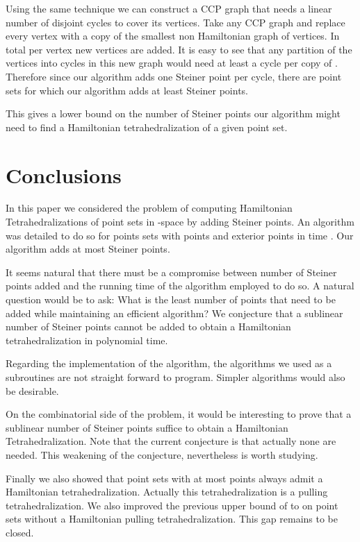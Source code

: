 \documentclass{article}
\begin{document}
Using the same technique we can construct a CCP graph that needs a linear number of disjoint cycles to cover its vertices. Take any CCP graph and replace every vertex with a copy of the smallest
non Hamiltonian graph  of  vertices. In total per vertex  new vertices are added. It is easy to see that any partition of the vertices into cycles in this new graph would need at least a cycle per
 copy of . Therefore since our algorithm adds one Steiner point per cycle, there  are point sets
for which our algorithm adds at least  Steiner points.\par

 This gives a lower bound on the number of Steiner points our algorithm might need to find a Hamiltonian tetrahedralization of a given point set.

\section{Conclusions}\label{section:conclusions}

In this paper we considered the problem of computing Hamiltonian Tetrahedralizations
of point sets in -space by adding Steiner points. An algorithm was detailed to do so
for points sets with  points and  exterior points in time   .
Our algorithm adds at most   Steiner points.\par

It seems natural that there must be a compromise between number of Steiner points added and
the running time of the algorithm employed to do so. A natural question would be to ask:
What is the least number of points that need to be added while maintaining an
efficient algorithm? We conjecture that a sublinear number
of Steiner points cannot be added to obtain a Hamiltonian
tetrahedralization in polynomial time.\par

Regarding the implementation of the algorithm, the algorithms we used
as a subroutines are not straight forward to program. Simpler algorithms
would also be desirable.\par

On the combinatorial side of the problem, it would be interesting to prove
that a sublinear number of Steiner points suffice to obtain a Hamiltonian
Tetrahedralization. Note that the current conjecture is that actually
none are needed. This weakening of the conjecture, nevertheless is worth
studying.\par

Finally we also showed that point sets with at most  points always admit
a Hamiltonian tetrahedralization. Actually this tetrahedralization is a pulling 
tetrahedralization. We also improved the previous upper bound of  to
 on point sets without a Hamiltonian pulling tetrahedralization.
This gap remains to be closed.






\end{document}
